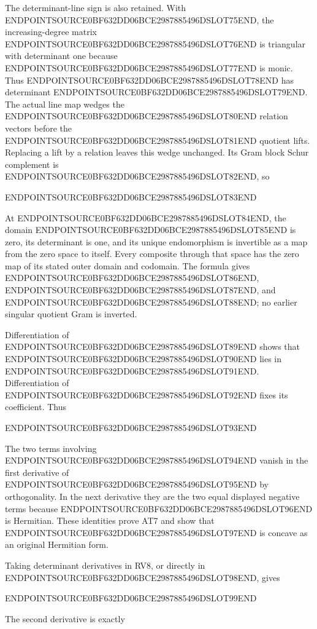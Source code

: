 The determinant-line sign is also retained. With ENDPOINTSOURCE0BF632DD06BCE2987885496DSLOT75END, the increasing-degree matrix ENDPOINTSOURCE0BF632DD06BCE2987885496DSLOT76END is triangular with determinant one because ENDPOINTSOURCE0BF632DD06BCE2987885496DSLOT77END is monic. Thus ENDPOINTSOURCE0BF632DD06BCE2987885496DSLOT78END has determinant ENDPOINTSOURCE0BF632DD06BCE2987885496DSLOT79END. The actual line map wedges the ENDPOINTSOURCE0BF632DD06BCE2987885496DSLOT80END relation vectors before the ENDPOINTSOURCE0BF632DD06BCE2987885496DSLOT81END quotient lifts. Replacing a lift by a relation leaves this wedge unchanged. Its Gram block Schur complement is ENDPOINTSOURCE0BF632DD06BCE2987885496DSLOT82END, so

ENDPOINTSOURCE0BF632DD06BCE2987885496DSLOT83END

At ENDPOINTSOURCE0BF632DD06BCE2987885496DSLOT84END, the domain ENDPOINTSOURCE0BF632DD06BCE2987885496DSLOT85END is zero, its determinant is one, and its unique endomorphism is invertible as a map from the zero space to itself. Every composite through that space has the zero map of its stated outer domain and codomain. The formula gives ENDPOINTSOURCE0BF632DD06BCE2987885496DSLOT86END, ENDPOINTSOURCE0BF632DD06BCE2987885496DSLOT87END, and ENDPOINTSOURCE0BF632DD06BCE2987885496DSLOT88END; no earlier singular quotient Gram is inverted.

Differentiation of ENDPOINTSOURCE0BF632DD06BCE2987885496DSLOT89END shows that ENDPOINTSOURCE0BF632DD06BCE2987885496DSLOT90END lies in ENDPOINTSOURCE0BF632DD06BCE2987885496DSLOT91END. Differentiation of ENDPOINTSOURCE0BF632DD06BCE2987885496DSLOT92END fixes its coefficient. Thus

ENDPOINTSOURCE0BF632DD06BCE2987885496DSLOT93END

The two terms involving ENDPOINTSOURCE0BF632DD06BCE2987885496DSLOT94END vanish in the first derivative of ENDPOINTSOURCE0BF632DD06BCE2987885496DSLOT95END by orthogonality. In the next derivative they are the two equal displayed negative terms because ENDPOINTSOURCE0BF632DD06BCE2987885496DSLOT96END is Hermitian. These identities prove AT7 and show that ENDPOINTSOURCE0BF632DD06BCE2987885496DSLOT97END is concave as an original Hermitian form.

Taking determinant derivatives in RV8, or directly in ENDPOINTSOURCE0BF632DD06BCE2987885496DSLOT98END, gives

ENDPOINTSOURCE0BF632DD06BCE2987885496DSLOT99END

The second derivative is exactly

